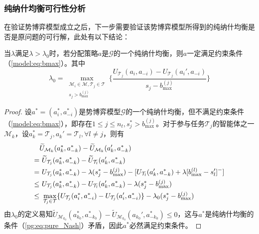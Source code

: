 \subsubsection{纯纳什均衡可行性分析}
\label{pg:mwlu:pgexist}
在验证势博弈模型成立之后，下一步需要验证该势博弈模型所得到的纯纳什均衡是否是原问题的可行解，此处有以下结论：

\begin{proposition}[纳什均衡可行性]
\label{pg:pro:feasibility}
	当$\lambda$满足$\lambda > \lambda_0$时，若分配策略$a$是$\mathcal{G}$的一个纯纳什均衡，则$a$一定满足约束条件（\ref{model:eq:bmax}）。其中
	\begin{equation}
		\lambda_0 = \max_{\substack{\mathcal{M}_i \in \mathcal{M}, \mathcal{T}_j \in \mathcal{T} \\ s_j > b_{\text{max}}^{(j)}}} \Bigg\{ \frac{U_{\mathcal{T}_j}(a_i,a_{-i}) - U_{\mathcal{T}_j}(a_i',a_{-i})}{s_j-b_{\text{max}}^{(j)}} \Bigg\}
	\end{equation}
	
	\begin{proof}
		设$a^*=(a_i^*,a_{-i}^*)$是势博弈模型$\mathcal{G}$的一个纯纳什均衡，但不满足约束条件（\ref{model:eq:bmax}），即存在$1\leq j \leq n_t, s_j^* > b_{\text{max}}^{(j)}$。对于参与任务$\mathcal{T}_j$的智能体之一$\mathcal{M}_k$，设$a_k^*=\mathcal{T}_j,a_k'=\mathcal{T}_l,\forall l \neq j$，则有
		\begin{align}
			&\widetilde U_{\mathcal{M}_k}(a_k^*,a_{-k}^*) - \widetilde U_{\mathcal{M}_k}(a_k',a_{-k}^*)\notag\\
		    =&\ \widetilde U_{\mathcal{T}_j}(a_k^*,a_{-k}^*) - \widetilde U_{\mathcal{T}_l}(a_k',a_{-k}^*)\notag\\
		    =&\ U_{\mathcal{T}_j}(a_k^*,a_{-k}^*) - \lambda(s_j^*-b_{\text{max}}^{(j)}) - [U_{\mathcal{T}_l}(a_k',a_{-k}^*) + \lambda[b_{\text{max}}^{(l)} - s_l']^-]\notag\\
		    \leq &\ U_{\mathcal{T}_j}(a_k^*,a_{-k}^*) - U_{\mathcal{T}_l}(a_k',a_{-k}^*) - \lambda(s_j^*-b_{\text{max}}^{(j)}) \notag \\
		    \leq &\ \max_{\mathcal{T}_j \in \mathcal{T}} \{U_{\mathcal{T}_j}(a_i^*,a_{-i}^*) - U_{\mathcal{T}_j}(a_i',a_{-i}^*)\} - \lambda_0(s_j^*-b_{\text{max}}^{(j)})
		\end{align}
		由$\lambda_0$的定义易知$\widetilde U_{\mathcal{M}_{k_0}}(a_{k_0}^*,a_{-{k_0}}^*) - \widetilde U_{\mathcal{M}_{k_0}}(a_{k_0}',a_{-{k_0}}^*) \leq 0$，这与$a^*$是纯纳什均衡的条件（\ref{pg:eq:pure_Nash}）矛盾，因此$a^*$必然满足约束条件。
	\end{proof}
	
\end{proposition}

